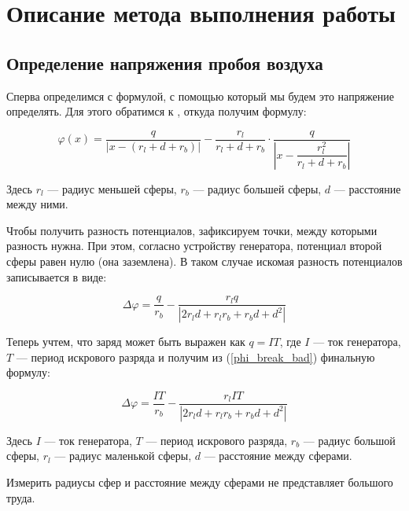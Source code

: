\documentclass[a4paper, 12pt]{article}
\renewcommand{\phi}{\varphi} %
\begin{document}
\section{Описание метода выполнения работы}


\subsection{Определение напряжения пробоя воздуха}

Сперва определимся с формулой, с помощью который мы будем это напряжение определять. Для этого обратимся к \cite{Jackson}, откуда получим формулу:

\begin{equation}
	\phi(x) = \frac{q}{|x - \left(r_l + d + r_b\right)|} - \frac{r_l}{r_l + d + r_b} \cdot \frac{q}{\left|x - \dfrac{r_l^2}{r_l + d + r_b}\right|}
\end{equation}

Здесь $r_l$ --- радиус меньшей сферы, $r_b$ --- радиус большей сферы, $d$ --- расстояние между ними.

\medspace

Чтобы получить разность потенциалов, зафиксируем точки, между которыми разность нужна. При этом, согласно устройству генератора, потенциал второй сферы равен нулю (она заземлена). В таком случае искомая разность потенциалов записывается в виде:

\begin{equation}
	\Delta \phi = \frac{q}{r_b} - \frac{r_l q}{\left|2 r_l d + r_l r_b + r_b d + d^2\right|}
	\label{phi_break_bad}
\end{equation}

\medspace

Теперь учтем, что заряд может быть выражен как $q = I T$, где $I$ --- ток генератора, $T$ --- период искрового разряда и получим из (\ref{phi_break_bad}) финальную формулу:

\begin{equation}
	\Delta \phi = \frac{IT}{r_b} - \frac{r_l IT}{\left|2 r_l d + r_l r_b + r_b d + d^2\right|}
	\label{phi_break_better}
\end{equation} 

Здесь $I$ --- ток генератора, $T$ --- период искрового разряда, $r_b$ --- радиус большой сферы, $r_l$ --- радиус маленькой сферы, $d$ --- расстояние между сферами.

\medspace

Измерить радиусы сфер и расстояние между сферами не представляет большого труда.
\end{document}
